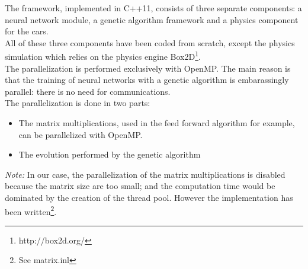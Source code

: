 \documentclass{acm_proc_article-sp}
\begin{document}
The framework, implemented in C++11, consists of three separate components: a neural network module, a genetic algorithm framework and a physics component for the cars.\\
All of these three components have been coded from scratch, except the physics simulation which relies on the physics engine Box2D\footnote{http://box2d.org/}. \\

\noindent
The parallelization is performed exclusively with OpenMP. The main reason is that the training of neural networks with  a genetic algorithm is embarassingly parallel: there is no need for communications. \\

\noindent
The parallelization is done in two parts:
\begin{itemize}
	\item The matrix multiplications, used in the feed forward  algorithm for example, can be parallelized with OpenMP.
	\item The evolution performed by the genetic algorithm
\end{itemize}
\textit{Note:} In our case, the parallelization of the matrix multiplications is disabled because the matrix size are too small; and the computation time would be dominated by the creation of the thread pool. However the implementation has been written\footnote{See matrix.inl}. \\
\end{document}
